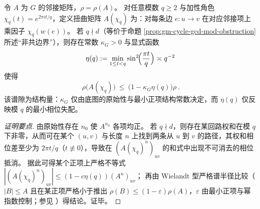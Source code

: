 \begin{theorem}\label{thm:gm-uniform-twist-gap-from-gcd}
令 \(A\) 为 \(G\) 的邻接矩阵，\(\rho=\rho(A)\)。
对任意模数 \(q\ge 2\) 与加性角色 \(\chi_q(t)=e^{2\pi i t/q}\)，定义扭曲矩阵 \(A(\chi_q)\) 为：对每条边 \(e:u\to v\) 在对应邻接项上乘因子 \(\chi_q(w(e))\)。
若 \(q\nmid d\)（等价于命题 \ref{prop:gm-cycle-gcd-mod-obstruction} 所述“非共边界”），则存在常数 \(\kappa_G>0\) 与显式函数
\[
\eta(q):=\min_{1\le t<q}\sin^2\!\Bigl(\frac{\pi t}{q}\Bigr)\asymp q^{-2}
\]
使得
\[
\boxed{\ \rho\!\bigl(A(\chi_q)\bigr)\ \le\ \bigl(1-\kappa_G\eta(q)\bigr)\rho\ }.
\]
该谱隙为结构量：\(\kappa_G\) 仅由底图的原始性与最小正项结构常数决定，而 \(\eta(q)\) 仅反映模 \(q\) 的最小相位失配。
\end{theorem}

\begin{proof}[证明要点]
由原始性存在 \(n_0\) 使 \(A^{n_0}\) 各项均正。
若 \(q\nmid d\)，则存在某回路权和在模 \(q\) 下非零，从而可在某个 \((u,v)\) 与长度 \(n\) 上找到两条从 \(u\) 到 \(v\) 的路径，其权和相位差至少为 \(2\pi t/q\)（\(t\not\equiv 0\)），导致在 \((A(\chi_q)^n)_{uv}\) 的和式中出现不可消去的相位抵消。
据此可得某个正项上严格不等式
\(
|(A(\chi_q)^n)_{uv}|\le (1-c\eta(q))(A^n)_{uv}
\)；
再由 Wielandt 型严格谱半径比较（\(|B|\le A\) 且在某正项严格小于推出 \(\rho(B)\le (1-\varepsilon)\rho(A)\)，\(\varepsilon\) 由最小正项与幂指数控制；参见 \cite{Wielandt1950UnzerlegbareNichtnegative}）得结论。证毕。
\end{proof}

